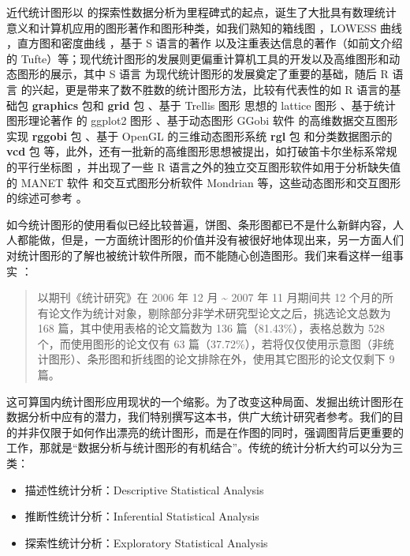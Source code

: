 \documentclass[
  b5paper,
  UTF8,twoside]{book}
\providecommand{\tightlist}{%
  \setlength{\itemsep}{0pt}\setlength{\parskip}{0pt}}
\begin{document}
近代统计图形以 \citet{Tukey1977} 的探索性数据分析为里程碑式的起点，诞生了大批具有数理统计意义和计算机应用的图形著作和图形种类，如我们熟知的箱线图 \citep{McGill78}，LOWESS 曲线 \citep{Cleveland79}，直方图和密度曲线 \citep{Scott92}，基于 S 语言的著作 \citep{Chambers83} 以及注重表达信息的著作（如前文介绍的 Tufte）等；现代统计图形的发展则更偏重计算机工具的开发以及高维图形和动态图形的展示，其中 S 语言 \citep{Becker88} 为现代统计图形的发展奠定了重要的基础，随后 R 语言 \citep{Ihaka96, base} 的兴起，更是带来了数不胜数的统计图形方法，比较有代表性的如 R 语言的基础包 \textbf{graphics} 包和 \textbf{grid} 包 \citep{Murrell05}、基于 Trellis 图形 \citep{Cleveland93} 思想的 lattice 图形 \citep{Sarkar08}、基于统计图形理论著作 \citet{Wilkinson05} 的 ggplot2 图形 \citep{ggplot2}、基于动态图形 GGobi 软件 \citep{Cook07} 的高维数据交互图形实现 \textbf{rggobi} 包 \citep{rggobi}、基于 OpenGL 的三维动态图形系统 \textbf{rgl} 包 \citep{rgl} 和分类数据图示的 \textbf{vcd} 包 \citep{vcd} 等，此外，还有一批新的高维图形思想被提出，如打破笛卡尔坐标系常规的平行坐标图 \citep{Inselberg07}，并出现了一些 R 语言之外的独立交互图形软件如用于分析缺失值的 MANET 软件 \citep{Unwin96} 和交互式图形分析软件 Mondrian \citep{Theus02} 等，这些动态图形和交互图形的综述可参考 \citet{Jurgen04}。

如今统计图形的使用看似已经比较普遍，饼图、条形图都已不是什么新鲜内容，人人都能做，但是，一方面统计图形的价值并没有被很好地体现出来，另一方面人们对统计图形的了解也被统计软件所限，而不能随心创造图形。我们来看这样一组事实 \citep{Xie08}：

\begin{quote}
以期刊《统计研究》在 2006 年 12 月 \textasciitilde{} 2007 年 11 月期间共 12 个月的所有论文作为统计对象，剔除部分非学术研究型论文之后，挑选论文总数为 168 篇，其中使用表格的论文篇数为 136 篇（81.43\%），表格总数为 528 个，而使用图形的论文仅有 63 篇（37.72\%），若将仅仅使用示意图（非统计图形）、条形图和折线图的论文排除在外，使用其它图形的论文仅剩下 9 篇。
\end{quote}

这可算国内统计图形应用现状的一个缩影。为了改变这种局面、发掘出统计图形在数据分析中应有的潜力，我们特别撰写这本书，供广大统计研究者参考。我们的目的并非仅限于如何作出漂亮的统计图形，而是在作图的同时，强调图背后更重要的工作，那就是``数据分析与统计图形的有机结合''。传统的统计分析大约可以分为三类：

\begin{itemize}
\tightlist
\item
  描述性统计分析：Descriptive Statistical Analysis
\item
  推断性统计分析：Inferential Statistical Analysis
\item
  探索性统计分析：Exploratory Statistical Analysis
\end{itemize}
\end{document}
